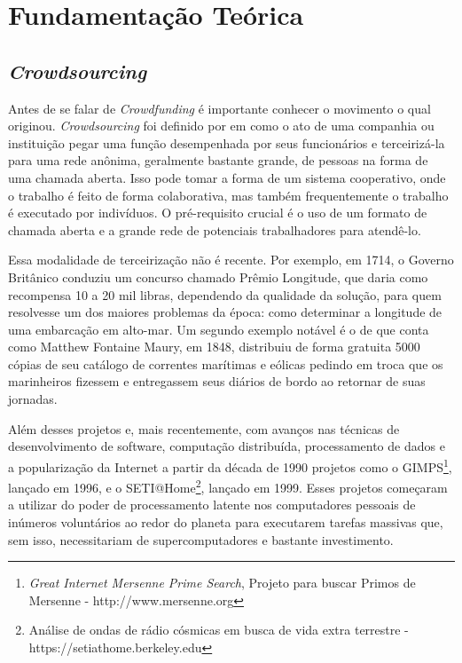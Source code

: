 \chapter{Fundamentação Teórica} \label{cha:fundamentacao}

\section{\emph{Crowdsourcing}} \label{sec:fundamentacao:crowdsourcing}
Antes de se falar de \emph{Crowdfunding} é importante conhecer o movimento o qual originou. \emph{Crowdsourcing} foi definido por \citeauthor{wired-crowdsource} em \citeyear{wired-crowdsource} como o ato de uma companhia ou instituição pegar uma função desempenhada por seus funcionários e terceirizá-la para uma rede anônima, geralmente bastante grande, de pessoas na forma de uma chamada aberta. Isso pode tomar a forma de um sistema cooperativo, onde o trabalho é feito de forma colaborativa, mas também frequentemente o trabalho é executado por indivíduos. O pré-requisito crucial é o uso de um formato de chamada aberta e a grande rede de potenciais trabalhadores para atendê-lo.

Essa modalidade de terceirização não é recente. Por exemplo, em 1714, o Governo Britânico conduziu um concurso chamado Prêmio Longitude\cite{wiki-longitude_rewards}, que daria como recompensa 10 a 20 mil libras, dependendo da qualidade da solução, para quem resolvesse um dos maiores problemas da época: como determinar a longitude de uma embarcação em alto-mar. Um segundo exemplo notável é o de \citeauthor{hearn2002tracks} que conta como Matthew Fontaine Maury, em 1848, distribuiu de forma gratuita 5000 cópias de seu catálogo de correntes marítimas e eólicas pedindo em troca que os marinheiros fizessem e entregassem seus diários de bordo ao retornar de suas jornadas.

Além desses projetos e, mais recentemente, com avanços nas técnicas de desenvolvimento de software, computação distribuída, processamento de dados e a popularização da Internet a partir da década de 1990 projetos como o GIMPS\footnote{\emph{Great Internet Mersenne Prime Search}, Projeto para buscar Primos de Mersenne - http://www.mersenne.org}, lançado em 1996, e o SETI@Home\footnote{Análise de ondas de rádio cósmicas em busca de vida extra terrestre - https://setiathome.berkeley.edu}, lançado em 1999. Esses projetos começaram a utilizar do poder de processamento latente nos computadores pessoais de inúmeros voluntários ao redor do planeta para executarem tarefas massivas que, sem isso, necessitariam de supercomputadores e bastante investimento.

